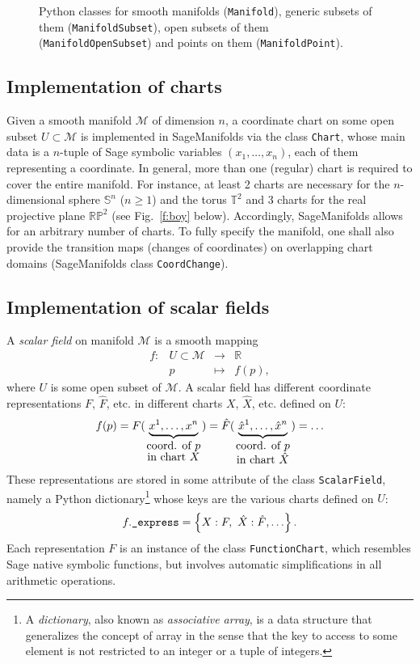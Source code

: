 \documentclass[a4paper]{jpconf}
\newcommand{\soft}[1]{\textsf{#1}}
\newcommand{\code}[1]{\texttt{#1}}
\newcommand{\Sage}{\soft{Sage}}
\newcommand{\SM}{\soft{SageManifolds}}
\newcommand{\be}{\begin{equation}}
\newcommand{\ee}{\end{equation}}
\begin{document}
\begin{figure}
\begin{center}

\end{center}
\caption{\label{f:domain_classes} Python classes for 
smooth manifolds (\code{Manifold}), generic subsets of them 
(\code{ManifoldSubset}), open subsets of them (\code{ManifoldOpenSubset})
and points on them (\code{ManifoldPoint}).}
\end{figure}

\subsection{Implementation of charts}

Given a smooth manifold $\mathcal{M}$ of dimension $n$, a coordinate chart 
on some open subset $U\subset\mathcal{M}$ is implemented in \SM{} 
via the class \code{Chart}, whose main data is 
a $n$-tuple of \Sage{} symbolic variables $(x_1,\ldots,x_n)$, each of 
them representing a coordinate.
In general, more than one (regular) chart is required to cover the entire manifold.
For instance, at least 2 charts are necessary for the $n$-dimensional sphere 
$\mathbb{S}^n$ ($n\geq 1$) and the torus $\mathbb{T}^2$ and 3 charts for the real projective plane
$\mathbb{RP}^2$ (see Fig.~\ref{f:boy} below). 
Accordingly, \SM{} allows for an arbitrary number of charts. 
To fully specify the manifold, one shall also provide the transition maps
(changes of coordinates) on
overlapping chart domains (\SM{} class \code{CoordChange}).


\subsection{Implementation of scalar fields}

A \emph{scalar field} on manifold $\mathcal{M}$ is a smooth mapping
\be
    \begin{array}{lcll}
    f: & U\subset \mathcal{M}&\longrightarrow &\mathbb{R} \\
       & p & \longmapsto  & f(p) ,
    \end{array}
\ee
where $U$ is some open subset of $\mathcal{M}$.
A scalar field has different coordinate representations $F$, $\hat F$, etc. 
in different charts $X$, $\hat X$, etc. defined on $U$:
\be
    f(p) = 
F(\underbrace{x^1,\ldots, x^n}_{\mbox{coord. of $p$}\atop\mbox{in chart $X$}}) 
= {\hat F}(\underbrace{{\hat x}^1,\ldots, {\hat x}^n}_{\mbox{coord. of $p$}\atop\mbox{in chart $\hat X$}})
= \ldots
\ee
These representations are 
stored in some attribute of the class \code{ScalarField}, namely a 
Python dictionary\footnote{A \emph{dictionary}, also known as \emph{associative array}, is a 
data structure that generalizes the concept of array in the sense that the
key to access to some element is not restricted to an integer or a tuple of integers.} 
whose keys are the various charts defined on $U$:
\be \label{e:f_express}
 f.\mbox{\texttt{\_express}} = \left\{ X: F,\ \hat X: \hat F, \ldots \right\} .
\ee
Each representation $F$ is an instance of the class \code{FunctionChart}, 
which resembles \Sage{} native symbolic functions, but involves 
automatic simplifications in all arithmetic operations. 
\end{document}
